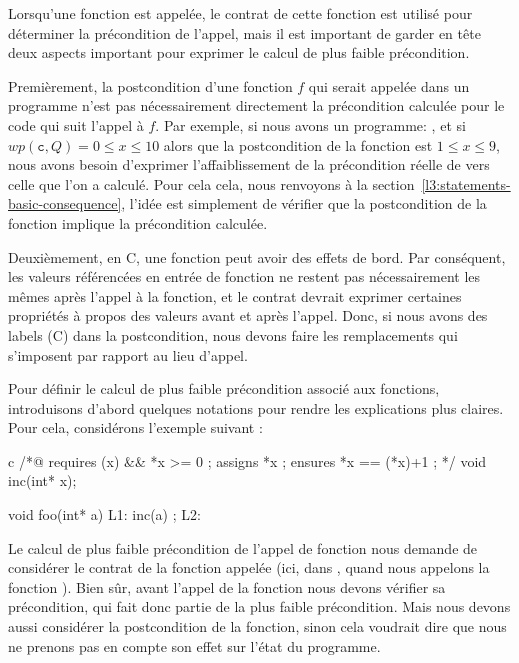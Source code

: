 

Lorsqu'une fonction est appelée, le contrat de cette fonction est utilisé pour
déterminer la précondition de l'appel, mais il est important de garder en tête deux
aspects important pour exprimer le calcul de plus faible précondition.


Premièrement, la postcondition d'une fonction $f$ qui serait appelée dans un 
programme n'est pas nécessairement directement la précondition calculée pour le code
qui suit l'appel à $f$. Par exemple, si nous avons un programme:
, et si $wp(\texttt{c}, Q) = 0 \leq x \leq 10$ alors que
la postcondition de la fonction  est $1 \leq x \leq 9$, nous avons
besoin d'exprimer l'affaiblissement de la précondition réelle de 
vers celle que l'on a calculé. Pour cela cela, nous renvoyons à la
section~\ref{l3:statements-basic-consequence}, l'idée est simplement de vérifier 
que la postcondition de la fonction implique la précondition calculée.



Deuxièmement, en C, une fonction peut avoir des effets de bord. Par conséquent, les
valeurs référencées en entrée de fonction ne restent pas nécessairement les mêmes
après l'appel à la fonction, et le contrat devrait exprimer certaines propriétés à
propos des valeurs avant et après l'appel. Donc, si nous avons des labels (C) dans
la postcondition, nous devons faire les remplacements qui s'imposent par rapport au
lieu d'appel.



Pour définir le calcul de plus faible précondition associé aux fonctions, introduisons
d'abord quelques notations pour rendre les explications plus claires. Pour cela,
considérons l'exemple suivant :

\begin{CodeBlock}{c}
/*@ requires \valid(x) && *x >= 0 ;
    assigns *x ;
    ensures *x == \old(*x)+1 ; */
void inc(int* x);

void foo(int* a){
  L1:
  inc(a) ;
  L2:
}
\end{CodeBlock}


Le calcul de plus faible précondition de l'appel de fonction nous demande de
considérer le contrat de la fonction appelée (ici, dans , quand
nous appelons la fonction ). Bien sûr, avant l'appel de la fonction
nous devons vérifier sa précondition, qui fait donc partie de la plus faible
précondition. Mais nous devons aussi considérer la postcondition de la fonction,
sinon cela voudrait dire que nous ne prenons pas en compte son effet sur l'état du
programme.


